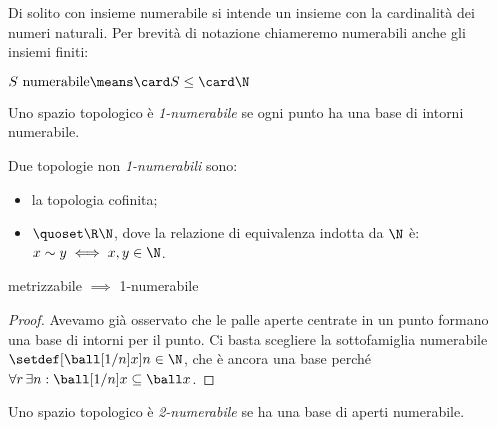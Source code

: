 
Di solito con insieme numerabile si intende un insieme con la cardinalità dei numeri naturali. Per brevità di notazione chiameremo numerabili anche gli insiemi finiti:

\begin{defn}[Numerabilità]
	$S\text{ numerabile}\means\card S\leq\card\N$
\end{defn}

\begin{defn}[1-numerabilità]
	Uno spazio topologico è \emph{1-numerabile} se ogni punto ha una base di intorni numerabile.
\end{defn}

\begin{es}
	Due topologie non \emph{1-numerabili} sono:
	\begin{itemize}
		\item la topologia cofinita;
		\item $\quoset\R\N$,
			dove la relazione di equivalenza\footnotemark{} indotta da $\N$ è:
			$x \sim y \iff x, y \in \N$.
	\end{itemize}
\end{es}

\begin{prop}
	metrizzabile $\implies$ 1-numerabile
\end{prop}

\begin{proof}
	Avevamo già osservato che le palle aperte centrate in un punto formano una base di intorni per il punto.
	Ci basta scegliere la sottofamiglia numerabile $\setdef[{\ball[1/n]x}]{n\in\N}$,
	che è ancora una base perché $\forall r\,\exists n:\ball[1/n]x\subseteq\ball x$.
\end{proof}

\begin{defn}[2-numerabilità]
	Uno spazio topologico è \emph{2-numerabile} se ha una base di aperti numerabile.
\end{defn}
